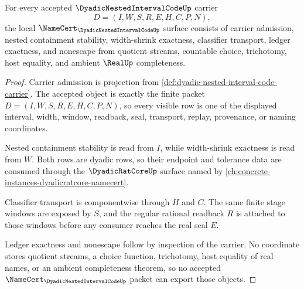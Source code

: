 \begin{theorem}
\label{thm:dyadic-nested-interval-code-namecert-obligations}
For every accepted $\DyadicNestedIntervalCodeUp$ carrier
$$
D=(I,W,S,R,E,H,C,P,N),
$$
the local $\NameCert_{\DyadicNestedIntervalCodeUp}$ surface consists of carrier admission, nested containment stability, width-shrink exactness, classifier transport, ledger exactness, and nonescape from quotient streams, countable choice, trichotomy, host equality, and ambient $\RealUp$ completeness.
\end{theorem}
\begin{proof}
Carrier admission is projection from \autoref{def:dyadic-nested-interval-code-carrier}. The accepted object is exactly the finite packet $D=(I,W,S,R,E,H,C,P,N)$, so every visible row is one of the displayed interval, width, window, readback, seal, transport, replay, provenance, or naming coordinates.

Nested containment stability is read from $I$, while width-shrink exactness is read from $W$. Both rows are dyadic rows, so their endpoint and tolerance data are consumed through the $\DyadicRatCoreUp$ surface named by \autoref{ch:concrete-instances-dyadicratcore-namecert}.

Classifier transport is componentwise through $H$ and $C$. The same finite stage windows are exposed by $S$, and the regular rational readback $R$ is attached to those windows before any consumer reaches the real seal $E$.

Ledger exactness and nonescape follow by inspection of the carrier. No coordinate stores quotient streams, a choice function, trichotomy, host equality of real names, or an ambient completeness theorem, so no accepted $\NameCert_{\DyadicNestedIntervalCodeUp}$ packet can export those objects.
\end{proof}

